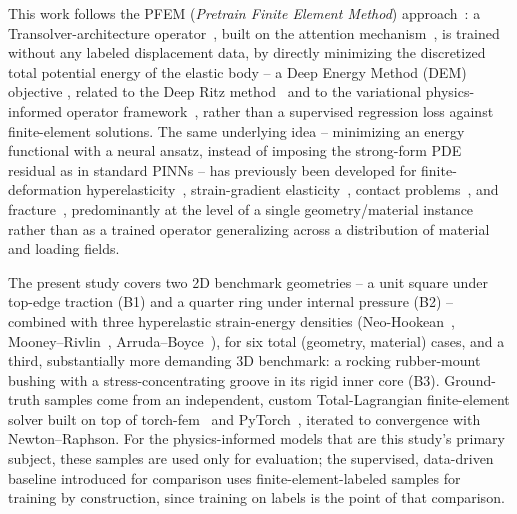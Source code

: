\documentclass[final,5p,times]{elsarticle}
\begin{document}
This work follows the PFEM (\emph{Pretrain Finite Element Method})
approach~\cite{wang2026pfem}: a Transolver-architecture
operator~\cite{wu2024transolver,luo2025transolverpp}, built on the attention
mechanism~\cite{vaswani2017attention}, is trained without any labeled
displacement data, by directly minimizing the discretized total potential
energy of the elastic body -- a Deep Energy Method (DEM)
objective \cite{samaniego2020energy,nguyen2020deep}, related to
the Deep Ritz method~\cite{e2018deepritz} and to the variational
physics-informed operator framework~\cite{eshaghi2025vino}, rather than a
supervised regression loss against finite-element solutions. The same
underlying idea -- minimizing an energy functional with a neural ansatz,
instead of imposing the strong-form PDE residual as in standard PINNs --
has previously been developed for finite-deformation
hyperelasticity~\cite{nguyen2020deep,abueidda2022dlem}, strain-gradient
elasticity~\cite{nguyen2021parametric}, contact
problems~\cite{bai2025energy}, and fracture~\cite{goswami2020transfer,wang2026xdem,zhang2026meshfree},
predominantly at the level of a single geometry/material instance rather
than as a trained operator generalizing across a distribution of material
and loading fields.

The present study covers two 2D benchmark geometries -- a unit square
under top-edge traction (B1) and a quarter ring under internal pressure
(B2) -- combined with three hyperelastic strain-energy densities
(Neo-Hookean~\cite{rivlin1948large}, Mooney--Rivlin~\cite{mooney1940theory},
Arruda--Boyce~\cite{arruda1993threedim}), for six total (geometry,
material) cases, and a third, substantially more demanding 3D benchmark: a
rocking rubber-mount bushing with a stress-concentrating groove in its
rigid inner core (B3). Ground-truth samples come from an
independent, custom Total-Lagrangian finite-element solver built on top
of torch-fem~\cite{meyer2024torchfem} and
PyTorch~\cite{paszke2019pytorch,baydin2018automatic}, iterated to
convergence with Newton\mbox{--}Raphson. For the physics-informed models
that are this
study's primary subject, these samples are used only for evaluation; the
supervised, data-driven baseline introduced for comparison uses
finite-element-labeled samples for training by construction, since
training on labels is the point of that comparison.
\end{document}
